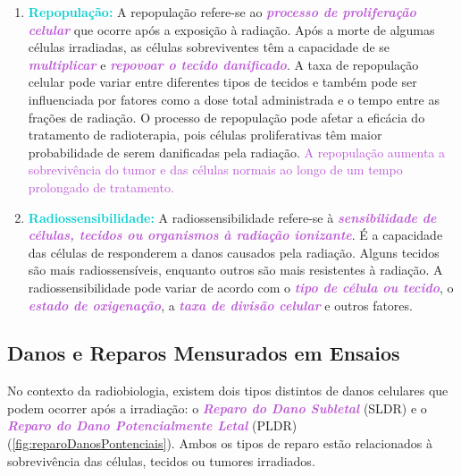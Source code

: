 \documentclass[11pt,a4paper]{article}
\begin{document}
\begin{enumerate}
		\item \textcolor{DarkTurquoise}{\textbf{Repopulação:}} A repopulação refere-se ao \textcolor{MediumOrchid}{\textbf{\textit{processo de proliferação celular}}} que ocorre após a exposição à radiação. Após a morte de algumas células irradiadas, as células sobreviventes têm a capacidade de se \textcolor{MediumOrchid}{\textbf{\textit{multiplicar}}} e \textcolor{MediumOrchid}{\textbf{\textit{repovoar o tecido danificado}}}. A taxa de repopulação celular pode variar entre diferentes tipos de tecidos e também pode ser influenciada por fatores como a dose total administrada e o tempo entre as frações de radiação. O processo de repopulação pode afetar a eficácia do tratamento de radioterapia, pois células proliferativas têm maior probabilidade de serem danificadas pela radiação. \textcolor{MediumOrchid}{A repopulação aumenta a sobrevivência do tumor e das células normais ao longo de um tempo prolongado de tratamento.}
		
		\item \textcolor{DarkTurquoise}{\textbf{Radiossensibilidade:}} A radiossensibilidade refere-se à \textcolor{MediumOrchid}{\textbf{\textit{sensibilidade  de células, tecidos ou organismos à radiação ionizante}}}. É a capacidade das células de responderem a danos causados pela radiação. Alguns tecidos são mais radiossensíveis, enquanto outros são mais resistentes à radiação. A radiossensibilidade pode variar de acordo com o \textcolor{MediumOrchid}{\textbf{\textit{tipo de célula ou tecido}}}, o \textcolor{MediumOrchid}{\textbf{\textit{estado de oxigenação}}}, a \textcolor{MediumOrchid}{\textbf{\textit{taxa de divisão celular}}} e outros fatores.
	\end{enumerate}

\subsection*{Danos e Reparos Mensurados em Ensaios}

	No contexto da radiobiologia, existem dois tipos distintos de danos celulares que podem ocorrer após a irradiação: o \textcolor{MediumOrchid}{\textbf{\textit{Reparo do Dano Subletal}}} (SLDR) e o \textcolor{MediumOrchid}{\textbf{\textit{Reparo do Dano Potencialmente Letal}}} (PLDR) (\ref{fig:reparoDanosPontenciais}). Ambos os tipos de reparo estão relacionados à sobrevivência das células, tecidos ou tumores irradiados.
\end{document}
